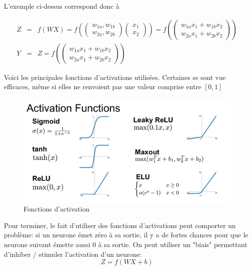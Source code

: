 \documentclass[11pt,a4paper]{report}
\begin{document}
    \par L'exemple ci-dessus correspond donc à 
    
    \begin{eqnarray}
    Z &=& f(WX)  = f\left(\begin{pmatrix} w_{1a} , w_{1b} \\ w_{2a}, w_{2b} \end{pmatrix}\begin{pmatrix} x_1 \\ x_2 \end{pmatrix}\right) = f\left(\begin{pmatrix} w_{1a}x_1 + w_{1b}x_2 \\ w_{2a}x_1+w_{2b}x_2 \end{pmatrix}\right) \\
    Y &=& Z = f\left(\begin{pmatrix} w_{1a}x_1 + w_{1b}x_2 \\ w_{2a}x_1+w_{2b}x_2 \end{pmatrix}\right)
    \end{eqnarray}
    
    \newpage
    \par Voici les principales fonctions d'activations utilisées. Certaines se sont vue efficaces, même si elles ne renvoient pas une valeur comprise entre $[0,1]$ 
    
    \begin{figure}[!h]
    \center
    \includegraphics[scale=0.22]{ressources/activation_functions.png}
    \caption{Fonctions d'activation}
    \end{figure} 
    
    \par Pour terminer, le fait d'utiliser des fonctions d'activations peut comporter un problème: si un neurone émet zéro à sa sortie, il y a de fortes chances pour que le neurone suivant émette aussi 0 à sa sortie. On peut utiliser un "biais" permettant d'inhiber / stimuler l'activation d'un neurone: 
    $$Z = f(WX+b)$$
    
\end{document}
